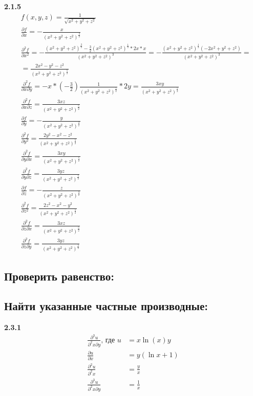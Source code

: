 \documentclass[a4paper, 12pt]{article}
\begin{document}
    \textbf{2.1.5}
    \begin{align*}
    &f(x,y,z) = \frac{1}{\sqrt{x^2+y^2+z^2}} \\
    &\frac{\partial f}{\partial x} = -\frac{x}{(x^2+y^2+z^2)^\frac{3}{2}} \\ 
    &\frac{\partial^2 f}{\partial x^2} = -\frac{(x^2+y^2+z^2)^\frac{3}{2} - \frac{3}{2}(x^2+y^2+z^2)^\frac{1}{2}*2x*x}{(x^2+y^2+z^2)^3} = 
    -\frac{(x^2+y^2+z^2)^\frac{1}{2}(-2x^2+y^2+z^2)}{(x^2+y^2+z^2)^3} = \\    
    &= \frac{2x^2-y^2-z^2}{(x^2+y^2+z^2)^\frac{5}{2}} \\
    &\frac{\partial^2 f}{\partial x \partial y} = -x*(-\frac{3}{2})\frac{1}{(x^2+y^2+z^2)^\frac{5}{2}}*2y = \frac{3xy}{(x^2+y^2+z^2)^\frac{5}{2}} \\
    &\frac{\partial^2 f}{\partial x \partial z} = \frac{3xz}{(x^2+y^2+z^2)^\frac{5}{2}} \\
    &\frac{\partial f}{\partial y} = -\frac{y}{(x^2+y^2+z^2)^\frac{3}{2}} \\
    &\frac{\partial^2 f}{\partial y^2} = \frac{2y^2-x^2-z^2}{(x^2+y^2+z^2)^\frac{5}{2}} \\
    &\frac{\partial^2 f}{\partial y \partial x} = \frac{3xy}{(x^2+y^2+z^2)^\frac{5}{2}} \\
    &\frac{\partial^2 f}{\partial y \partial z} = \frac{3yz}{(x^2+y^2+z^2)^\frac{5}{2}} \\
    &\frac{\partial f}{\partial z} = -\frac{z}{(x^2+y^2+z^2)^\frac{3}{2}} \\
    &\frac{\partial^2 f}{\partial z^2} = \frac{2z^2-x^2-y^2}{(x^2+y^2+z^2)^\frac{5}{2}} \\
    &\frac{\partial^2 f}{\partial z \partial x} = \frac{3xz}{(x^2+y^2+z^2)^\frac{5}{2}} \\
    &\frac{\partial^2 f}{\partial z \partial y} = \frac{3yz}{(x^2+y^2+z^2)^\frac{5}{2}}
    \end{align*}
    
    \subsection{Проверить равенство:}
    
    \subsection{Найти указанные частные производные:}
    
    \textbf{2.3.1}
    \begin{align*}
    \frac{\partial^3 u}{\partial^2 x \partial y} \text{, где } u &= x\ln{(x)}y \\
    \frac{\partial u}{\partial x} &= y(\ln{x}+1) \\
    \frac{\partial^2 u}{\partial^2 x} &= \frac{y}{x} \\
    \frac{\partial^3 u}{\partial^2 x \partial y} &= \frac{1}{x}
    \end{align*}
    
\end{document}
